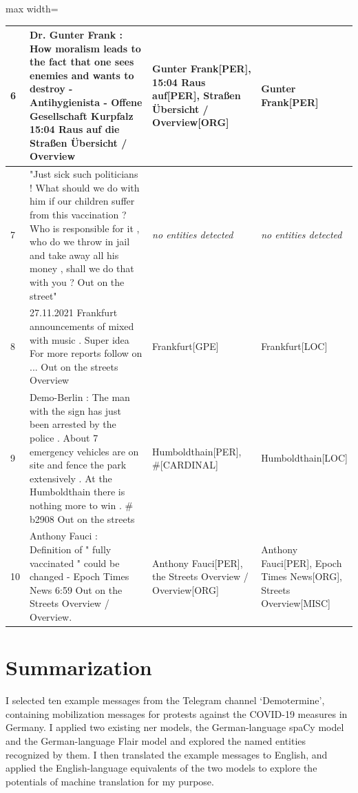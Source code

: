 \begin{table}[htp]
\begin{adjustbox}{max width=\textwidth}
\begin{tabular}{|p{0.04\linewidth}|p{0.55\linewidth}|p{0.36\linewidth}|p{0.3\linewidth}|}
6 
& Dr. Gunter Frank : How moralism leads to the fact that one sees enemies and wants to destroy - Antihygienista - Offene Gesellschaft Kurpfalz 15:04 Raus auf die Straßen \"Ubersicht / Overview 
& Gunter Frank[PER], 15:04 Raus auf[PER], Straßen Übersicht / Overview[ORG] 
& Gunter Frank[PER]\\ 
\hline

7 
&  "Just sick such politicians ! What should we do with him if our children suffer from this vaccination ? Who is responsible for it , who do we throw in jail and take away all his money , shall we do that with you ? Out on the street" 
& \textit{no entities detected}
& \textit{no entities detected}\\ 
\hline

8 
& 27.11.2021 Frankfurt announcements of mixed with music . Super idea For more reports follow on ... Out on the streets Overview 
& Frankfurt[GPE]
& Frankfurt[LOC]\\ 
\hline

9 
& Demo-Berlin : The man with the sign has just been arrested by the police . About 7 emergency vehicles are on site and fence the park extensively . At the Humboldthain there is nothing more to win . \# b2908 Out on the streets 
 
& Humboldthain[PER], \#[CARDINAL]
& Humboldthain[LOC]\\ 
\hline

10 
& Anthony Fauci : Definition of " fully vaccinated " could be changed - Epoch Times News 6:59 Out on the Streets Overview / Overview. 

& Anthony Fauci[PER], the Streets Overview / Overview[ORG]
& Anthony Fauci[PER], Epoch Times News[ORG], Streets Overview[MISC]
\end{tabular}
\end{adjustbox}
\end{table}

\section{Summarization}
I selected ten example messages from the Telegram channel `Demotermine', containing mobilization messages for protests against the COVID-19 measures in Germany. I applied two existing \gls{ner} models, the German-language spaCy model and the German-language Flair model and explored the named entities recognized by them. 
I then translated the example messages to English, and applied the English-language equivalents of the two models to explore the potentials of machine translation for my purpose. 

